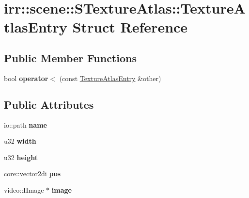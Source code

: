 \hypertarget{structirr_1_1scene_1_1_s_texture_atlas_1_1_texture_atlas_entry}{\section{irr\-:\-:scene\-:\-:S\-Texture\-Atlas\-:\-:Texture\-Atlas\-Entry Struct Reference}
\label{structirr_1_1scene_1_1_s_texture_atlas_1_1_texture_atlas_entry}
}
\subsection*{Public Member Functions}
\begin{DoxyCompactItemize}
\item 
\hypertarget{structirr_1_1scene_1_1_s_texture_atlas_1_1_texture_atlas_entry_ad32d9ca660717791239110b9fd92e93b}{bool {\bfseries operator$<$} (const \hyperlink{structirr_1_1scene_1_1_s_texture_atlas_1_1_texture_atlas_entry}{Texture\-Atlas\-Entry} \&other)}\label{structirr_1_1scene_1_1_s_texture_atlas_1_1_texture_atlas_entry_ad32d9ca660717791239110b9fd92e93b}

\end{DoxyCompactItemize}
\subsection*{Public Attributes}
\begin{DoxyCompactItemize}
\item 
\hypertarget{structirr_1_1scene_1_1_s_texture_atlas_1_1_texture_atlas_entry_ad3544823d5468505c52dee0ee0e9a797}{io\-::path {\bfseries name}}\label{structirr_1_1scene_1_1_s_texture_atlas_1_1_texture_atlas_entry_ad3544823d5468505c52dee0ee0e9a797}

\item 
\hypertarget{structirr_1_1scene_1_1_s_texture_atlas_1_1_texture_atlas_entry_ab0229fe993d01e88dfa7bcc1a84ab1df}{u32 {\bfseries width}}\label{structirr_1_1scene_1_1_s_texture_atlas_1_1_texture_atlas_entry_ab0229fe993d01e88dfa7bcc1a84ab1df}

\item 
\hypertarget{structirr_1_1scene_1_1_s_texture_atlas_1_1_texture_atlas_entry_a247c6f2d819025eb16abe9f7501d363e}{u32 {\bfseries height}}\label{structirr_1_1scene_1_1_s_texture_atlas_1_1_texture_atlas_entry_a247c6f2d819025eb16abe9f7501d363e}

\item 
\hypertarget{structirr_1_1scene_1_1_s_texture_atlas_1_1_texture_atlas_entry_a6d5af515e1544fb51580c8eb7a7f6c63}{core\-::vector2di {\bfseries pos}}\label{structirr_1_1scene_1_1_s_texture_atlas_1_1_texture_atlas_entry_a6d5af515e1544fb51580c8eb7a7f6c63}

\item 
\hypertarget{structirr_1_1scene_1_1_s_texture_atlas_1_1_texture_atlas_entry_a2266482b296016180046217469708c66}{video\-::\-I\-Image $\ast$ {\bfseries image}}\label{structirr_1_1scene_1_1_s_texture_atlas_1_1_texture_atlas_entry_a2266482b296016180046217469708c66}

\end{DoxyCompactItemize}


